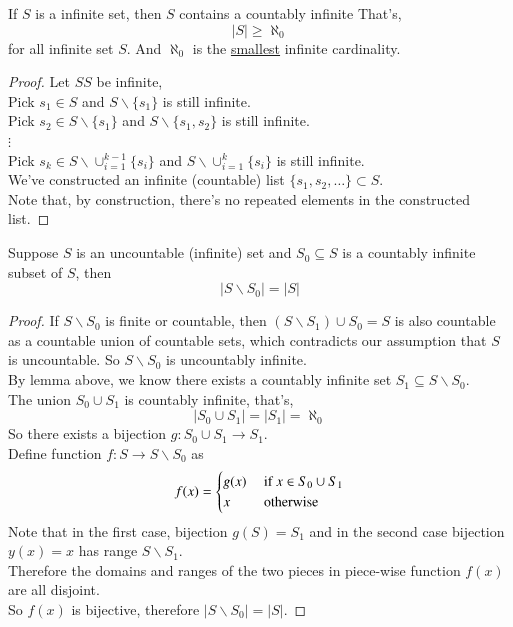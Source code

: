 \documentclass[10pt]{article}
\begin{document}
		\begin{lemma}
			If $S$ is a infinite set, then $S$ contains a countably infinite That's,
			\[|S| \geq \aleph_0\]
			for all infinite set $S$. And $\aleph_0$ is the \ul{smallest} infinite cardinality.
		\end{lemma}
		\begin{proof}
			Let $SS$ be infinite, \\
			Pick $s_1 \in S$ and $S \backslash \{s_1\}$ is still infinite. \\
			Pick $s_2 \in S\backslash\{s_1\}$ and $S \backslash \{s_1, s_2\}$ is still infinite. \\
			$\vdots$ \\
			Pick $s_k \in S \backslash \cup_{i=1}^{k-1}\{s_i\}$ and $S \backslash \cup_{i=1}^{k}\{s_i\}$ is still infinite. \\
			We've constructed an infinite (countable) list $\{s_1, s_2, \dots\} \subset S$. \\
			Note that, by construction, there's no repeated elements in the constructed list. 
		\end{proof}
		
		\begin{theorem}
			Suppose $S$ is an uncountable (infinite) set and $S_0 \subseteq S$ is a countably infinite subset of $S$, then
			\[
				|S \backslash S_0| = |S|
			\]
		\end{theorem}
		\begin{proof}
			If $S\backslash S_0$ is finite or countable, then $(S\backslash S_1) \cup S_0 = S$ is also countable as a countable union of countable sets, which contradicts our assumption that $S$ is uncountable. So $S \backslash S_0$ is uncountably infinite. \\
			By lemma above, we know there exists a countably infinite set $S_1 \subseteq S \backslash S_0$. \\
			The union $S_0 \cup S_1$ is countably infinite, that's,
			\[
				|S_0 \cup S_1| = |S_1| = \aleph_0
			\]
			So there exists a bijection $g:S_0 \cup S_1 \to S_1$. \\
			Define function $f: S \to S \backslash S_0$ as 
			\[
				f(x) = \begin{cases}
					g(x) &\text{{ if }} x \in S_0 \cup S_1 \\
					x &\text{{ otherwise}}
				\end{cases}
			\]
			Note that in the first case, bijection $g(S) = S_1$ and in the second case bijection $y(x)=x$ has range $S \backslash S_1$. \\
			Therefore the domains and ranges of the two pieces in piece-wise function $f(x)$ are all disjoint. \\
			So $f(x)$ is bijective, therefore $|S \backslash S_0| = |S|$.
		\end{proof}
\end{document}
